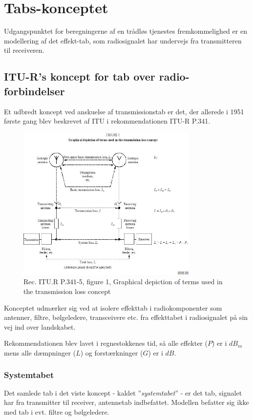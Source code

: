 \chapter{Tabs-konceptet}
Udgangspunktet for beregningerne af en trådløs tjenestes fremkommelighed er en modellering af det effekt-tab, som radiosignalet har undervejs fra transmitteren til receiveren.
\section{ITU-R's koncept for tab over radio-forbindelser}
Et udbredt koncept ved anskuelse af transmissionstab er det, der allerede i 1951 første gang blev beskrevet af ITU i rekommendationen ITU-R P.341\cite{itur_p341-5}.

\begin{figure}[h]
	\centering
	\includegraphics[width=0.8\textwidth]{figure/itur,P341-5,fig01.JPG}
	\caption{Rec. ITU.R P.341-5, figure 1, Graphical depiction of terms used in the transmission loss concept}
	\label{fig:zoner}
\end{figure}

Konceptet udmærker sig ved at isolere effekttab i radiokomponenter som antenner, filtre, bølgeledere, transceivere etc. fra effekttabet i radiosignalet på sin vej ind over landskabet.

Rekommendationen blev lavet i regnestokkenes tid, så alle effekter ($P$) er i $dB_m$ mens alle dæmpninger ($L$) og forstærkninger ($G$) er i $dB$.

\subsection{Systemtabet}
Det samlede tab i det viste koncept - kaldet ''\emph{systemtabet}'' - er det tab, signalet har fra transmitter til receiver, antennetab indbefattet. Modellen befatter sig ikke med tab i evt. filtre og bølgeledere. 

